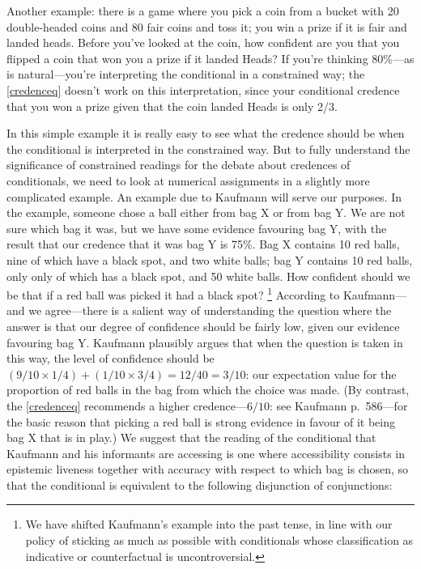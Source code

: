 \documentclass[If.tex]{subfiles}
\begin{document}
Another example: there is a game where you pick a coin from a bucket with 20 double-headed coins and 80 fair coins and toss it; you win a prize if it is fair and landed heads.  Before you've looked at the coin, how confident are you that you flipped a coin that won you a prize if it landed Heads?  If you're thinking 80\%---as is natural---you're interpreting the conditional in a constrained way; the \ref{credenceq} doesn't work on this interpretation, since your conditional credence that you won a prize given that the coin landed Heads is only 2/3.  

In this simple example it is really easy to see what the credence should be when the conditional is interpreted in the constrained way.  But to fully understand the significance of constrained readings for the debate about credences of conditionals, we need to look at numerical assignments in a slightly more complicated example.  An example due to Kaufmann will serve our purposes.  In the example, someone chose a ball either from bag X or from bag Y.  We are not sure which bag it was, but we have some evidence favouring bag Y, with the result that our credence that it was bag Y is 75\%.  Bag X contains 10 red balls, nine of which have a black spot, and two white balls; bag Y contains 10 red balls, only only of which has a black spot, and 50 white balls.  How confident should we be that if a red ball was picked it had a black spot?%
\footnote{We have shifted Kaufmann's example into the past tense, in line with our policy of sticking as much as possible with conditionals whose classification as indicative or counterfactual is uncontroversial.}  
According to Kaufmann---and we agree---there is a salient way of understanding the question where the answer is that our degree of confidence should be fairly low, given our evidence favouring bag Y.  Kaufmann plausibly argues that when the question is taken in this way, the level of confidence should be $(9/10 × 1/4) + (1/10 × 3/4) = 12/40 = 3/10$: our expectation value for the proportion of red balls in the bag from which the choice was made.  (By contrast, the \ref{credenceq} recommends a higher credence---$6/10$: see Kaufmann p.\ 586---for the basic reason that picking a red ball is strong evidence in favour of it being bag X that is in play.)  We suggest that the reading of the conditional that Kaufmann and his informants are accessing is one where accessibility consists in epistemic liveness together with accuracy with respect to which bag is chosen, so that the conditional is equivalent to the following disjunction of conjunctions:
\end{document}
